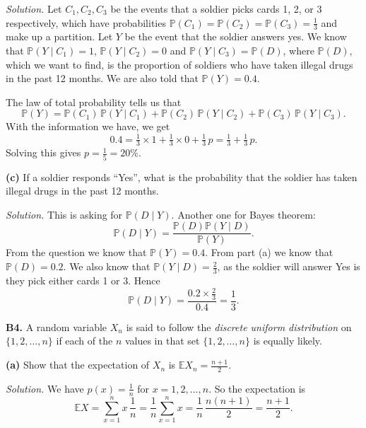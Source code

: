 \documentclass[
  a4paper,
]{book}
\theoremstyle{definition}
\theoremstyle{definition}
\theoremstyle{definition}
\theoremstyle{definition}
\theoremstyle{remark}
\begin{document}
\begin{myanswers}
\emph{Solution.}
Let \(C_1, C_2, C_3\) be the events that a soldier picks cards 1, 2, or 3 respectively, which have probabilities \(\mathbb P(C_1) = \mathbb P(C_2) = \mathbb P(C_3) = \frac13\) and make up a partition. Let \(Y\) be the event that the soldier answers yes. We know that \(\mathbb P(Y \mid C_1) = 1\), \(\mathbb P(Y \mid C_2) = 0\) and \(\mathbb P(Y \mid C_3) = \mathbb P(D)\), where \(\mathbb P(D)\), which we want to find, is the proportion of soldiers who have taken illegal drugs in the past 12 months. We are also told that \(\mathbb P(Y) = 0.4\).

The law of total probability tells us that
\[ \mathbb P(Y) = \mathbb P(C_1)\,\mathbb P(Y \mid C_1) + \mathbb P(C_2)\,\mathbb P(Y \mid C_2) + 
\mathbb P(C_3)\,\mathbb P(Y \mid C_3) .\]
With the information we have, we get
\[ 0.4 = \tfrac13 \times 1 + \tfrac13 \times 0 + \tfrac13 \, p = \tfrac13 + \tfrac13 \,p . \]
Solving this gives \(p = \frac15 = 20\%\).

\end{myanswers}

\textbf{(c)} If a soldier responds ``Yes'', what is the probability that the soldier has taken illegal drugs in the past 12 months.

\begin{myanswers}
\emph{Solution.}
This is asking for \(\mathbb P(D \mid Y)\). Another one for Bayes theorem:
\[ \mathbb P(D \mid Y) = \frac{\mathbb P(D) \mathbb P(Y \mid D)}{\mathbb P(Y)} . \]
From the question we know that \(\mathbb P(Y) = 0.4\). From part (a) we know that \(\mathbb P(D) = 0.2\). We also know that \(\mathbb P(Y \mid D) = \frac23\), as the soldier will answer Yes is they pick either cards 1 or 3. Hence
\[ \mathbb P(D \mid Y) = \frac{0.2 \times \frac23}{0.4} = \frac13 . \]

\end{myanswers}

\textbf{B4.} A random variable \(X_n\) is said to follow the \emph{discrete uniform distribution} on \(\{1, 2, \dots, n\}\) if each of the \(n\) values in that set \(\{1,2,\dots,n\}\) is equally likely.

\textbf{(a)} Show that the expectation of \(X_n\) is \(\mathbb EX_n = \displaystyle\frac{n+1}{2}\).

\begin{myanswers}
\emph{Solution.}
We have \(p(x) = \frac1n\) for \(x = 1, 2, \dots, n\). So the expectation is
\[ \mathbb EX = \sum_{x=1}^n x\,\frac{1}{n} = \frac{1}{n} \sum_{x = 1}^n x = \frac{1}{n}\, \frac{n(n+1)}{2} = \frac{n+1}{2} . \]

\end{myanswers}
\end{document}
